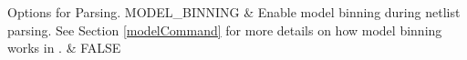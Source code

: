 


\begin{OptionTable}{Options for Parsing.}
\label{parserPKG}
MODEL\_BINNING & Enable model binning during netlist parsing.  See 
Section \ref{modelCommand} for more details on how model binning 
works in \Xyce{}. & FALSE \\ \hline
\end{OptionTable}

